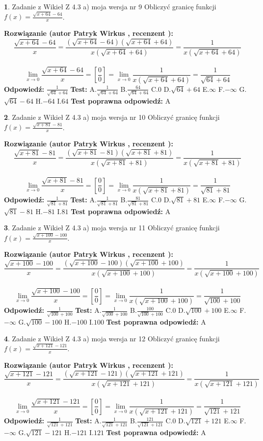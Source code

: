 \documentclass[12pt, a4paper]{article}
\theoremstyle{definition} %
\newtheorem{zad}{}
\newcommand{\zadStart}[1]{\begin{zad}#1\newline}
\newcommand{\zadStop}{\end{zad}}
\newcommand{\rozwStart}[2]{\noindent \textbf{Rozwiązanie (autor #1 , recenzent #2): }\newline}
\newcommand{\rozwStop}{\newline}
\newcommand{\odpStart}{\noindent \textbf{Odpowiedź:}\newline}
\newcommand{\odpStop}{\newline}
\newcommand{\testStart}{\noindent \textbf{Test:}\newline}
\newcommand{\testStop}{\newline}
\newcommand{\kluczStart}{\noindent \textbf{Test poprawna odpowiedź:}\newline}
\newcommand{\kluczStop}{\newline}
\begin{document}
\zadStart{Zadanie z Wikieł Z 4.3 a) moja wersja nr 9}
Obliczyć granicę funkcji $f(x)=\frac{\sqrt{x+64}-64}{x}$.
\zadStop
\rozwStart{Patryk Wirkus}{}
$$\frac{\sqrt{x+64}-64}{x}=\frac{(\sqrt{x+64}-64)(\sqrt{x+64}+64)}{x(\sqrt{x+64}+64)}=\frac{1}{x(\sqrt{x+64}+64)}$$
\\
$$\lim\limits_{x\to0}\frac{\sqrt{x+64}-64}{x}=[\frac{0}{0}]=
\lim\limits_{x\to0}\frac{1}{x(\sqrt{x+64}+64)} = \frac{1}{\sqrt{64}+64}$$
\rozwStop
\odpStart
$\frac{1}{\sqrt{64}+64}$
\odpStop
\testStart
A.$\frac{1}{\sqrt{64}+64}$
B.$\frac{64}{\sqrt{64}+64}$
C.$0$
D.$\sqrt{64}+64$
E.$\infty$
F.$-\infty$
G.$\sqrt{64}-64$
H.$-64$
I.$64$
\testStop
\kluczStart
A
\kluczStop



\zadStart{Zadanie z Wikieł Z 4.3 a) moja wersja nr 10}
Obliczyć granicę funkcji $f(x)=\frac{\sqrt{x+81}-81}{x}$.
\zadStop
\rozwStart{Patryk Wirkus}{}
$$\frac{\sqrt{x+81}-81}{x}=\frac{(\sqrt{x+81}-81)(\sqrt{x+81}+81)}{x(\sqrt{x+81}+81)}=\frac{1}{x(\sqrt{x+81}+81)}$$
\\
$$\lim\limits_{x\to0}\frac{\sqrt{x+81}-81}{x}=[\frac{0}{0}]=
\lim\limits_{x\to0}\frac{1}{x(\sqrt{x+81}+81)} = \frac{1}{\sqrt{81}+81}$$
\rozwStop
\odpStart
$\frac{1}{\sqrt{81}+81}$
\odpStop
\testStart
A.$\frac{1}{\sqrt{81}+81}$
B.$\frac{81}{\sqrt{81}+81}$
C.$0$
D.$\sqrt{81}+81$
E.$\infty$
F.$-\infty$
G.$\sqrt{81}-81$
H.$-81$
I.$81$
\testStop
\kluczStart
A
\kluczStop



\zadStart{Zadanie z Wikieł Z 4.3 a) moja wersja nr 11}
Obliczyć granicę funkcji $f(x)=\frac{\sqrt{x+100}-100}{x}$.
\zadStop
\rozwStart{Patryk Wirkus}{}
$$\frac{\sqrt{x+100}-100}{x}=\frac{(\sqrt{x+100}-100)(\sqrt{x+100}+100)}{x(\sqrt{x+100}+100)}=\frac{1}{x(\sqrt{x+100}+100)}$$
\\
$$\lim\limits_{x\to0}\frac{\sqrt{x+100}-100}{x}=[\frac{0}{0}]=
\lim\limits_{x\to0}\frac{1}{x(\sqrt{x+100}+100)} = \frac{1}{\sqrt{100}+100}$$
\rozwStop
\odpStart
$\frac{1}{\sqrt{100}+100}$
\odpStop
\testStart
A.$\frac{1}{\sqrt{100}+100}$
B.$\frac{100}{\sqrt{100}+100}$
C.$0$
D.$\sqrt{100}+100$
E.$\infty$
F.$-\infty$
G.$\sqrt{100}-100$
H.$-100$
I.$100$
\testStop
\kluczStart
A
\kluczStop



\zadStart{Zadanie z Wikieł Z 4.3 a) moja wersja nr 12}
Obliczyć granicę funkcji $f(x)=\frac{\sqrt{x+121}-121}{x}$.
\zadStop
\rozwStart{Patryk Wirkus}{}
$$\frac{\sqrt{x+121}-121}{x}=\frac{(\sqrt{x+121}-121)(\sqrt{x+121}+121)}{x(\sqrt{x+121}+121)}=\frac{1}{x(\sqrt{x+121}+121)}$$
\\
$$\lim\limits_{x\to0}\frac{\sqrt{x+121}-121}{x}=[\frac{0}{0}]=
\lim\limits_{x\to0}\frac{1}{x(\sqrt{x+121}+121)} = \frac{1}{\sqrt{121}+121}$$
\rozwStop
\odpStart
$\frac{1}{\sqrt{121}+121}$
\odpStop
\testStart
A.$\frac{1}{\sqrt{121}+121}$
B.$\frac{121}{\sqrt{121}+121}$
C.$0$
D.$\sqrt{121}+121$
E.$\infty$
F.$-\infty$
G.$\sqrt{121}-121$
H.$-121$
I.$121$
\testStop
\kluczStart
A
\kluczStop
\end{document}
